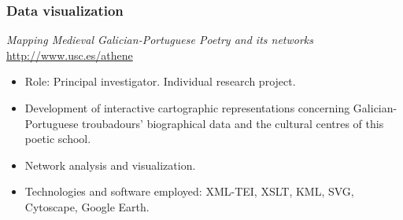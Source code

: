 \documentclass[11pt, a4paper]{article}
\newcommand{\years}[1]{\marginnote{\scriptsize #1}}
\begin{document}
\subsubsection{Data visualization}

\years{2016}\textit{Mapping Medieval Galician-Portuguese Poetry and its networks}\\
\href{http://www.usc.es/athene}{http://www.usc.es/athene}

\begin{itemize}[noitemsep,topsep=0pt]
\item Role: Principal investigator. Individual research project.
 \item Development of interactive cartographic representations concerning Galician-Portuguese troubadours’ biographical data and the cultural centres of this poetic school.
 \item Network analysis and visualization.
 \item Technologies and software employed: XML-TEI, XSLT, KML, SVG, Cytoscape, Google Earth.
\end{itemize}
\end{document}
